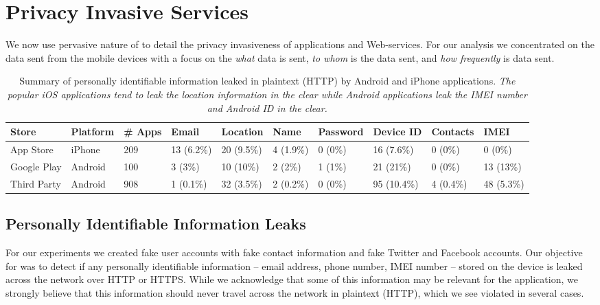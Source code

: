 \section{Privacy Invasive Services}
\label{sec:characterize-app}

We now use pervasive nature of \platname to detail  the privacy invasiveness of applications and Web-services. 
For our analysis we concentrated on the data sent from the mobile devices with a focus on the {\it what} data is sent,  {\it to whom} is the data sent, and {\it how frequently} is data sent.

\begin{table}[t]    
    \centering
    \begin{small}
    \begin{tabular}{|l|l|l|l|l|l|l|l|l|l|}
       \hline
       {\bf Store}&{\bf Platform}&{\bf \# Apps}&{\bf Email}& {\bf Location}& {\bf Name} &{\bf Password}& {\bf Device ID}& {\bf Contacts}& {\bf IMEI}\\
       \hline
       App Store&iPhone&209&13 (6.2\%) &20 (9.5\%)&4 (1.9\%)&0 (0\%)&16 (7.6\%)&0 (0\%)&0 (0\%)\\
       \hline
       Google Play&Android&100&3 (3\%)&10 (10\%)&2 (2\%)&1 (1\%)&21 (21\%)&0 (0\%)&13 (13\%)\\
       \hline
       Third Party&Android&908&1 (0.1\%)&32 (3.5\%)&2 (0.2\%)&0 (0\%)&95 (10.4\%)&4 (0.4\%)&48 (5.3\%)\\
       \hline
    \end{tabular}
    \end{small}
    \caption{Summary of personally identifiable information leaked in plaintext (HTTP) by Android and iPhone applications. \emph{The popular iOS applications tend to leak the location information in the clear while Android applications leak the IMEI number and Android ID in the clear.}}
    \label{tab:pii}
\end{table}

\subsection{Personally Identifiable Information Leaks}

For our experiments we created fake user accounts with fake contact information and fake Twitter and Facebook accounts.  
Our objective for was to detect if any personally identifiable information -- email address, phone number, IMEI number -- stored on the device is leaked across the network over HTTP or HTTPS.
While we acknowledge that some of this information may be relevant for the application, we strongly believe that this information should never travel across the network in plaintext (HTTP), which we see violated in several cases.

